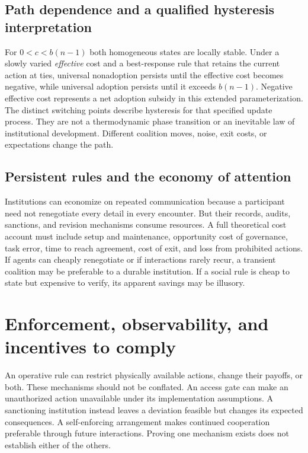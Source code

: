 \subsection{Path dependence and a qualified hysteresis interpretation}
For $0<c<b(n-1)$ both homogeneous states are locally stable. Under a slowly varied \emph{effective} cost and a best-response rule that retains the current action at ties, universal nonadoption persists until the effective cost becomes negative, while universal adoption persists until it exceeds $b(n-1)$. Negative effective cost represents a net adoption subsidy in this extended parameterization. The distinct switching points describe hysteresis for that specified update process. They are not a thermodynamic phase transition or an inevitable law of institutional development. Different coalition moves, noise, exit costs, or expectations change the path.

\subsection{Persistent rules and the economy of attention}

Institutions can economize on repeated communication because a participant need not renegotiate every detail in every encounter. But their records, audits, sanctions, and revision mechanisms consume resources. A full theoretical cost account must include setup and maintenance, opportunity cost of governance, task error, time to reach agreement, cost of exit, and loss from prohibited actions. If agents can cheaply renegotiate or if interactions rarely recur, a transient coalition may be preferable to a durable institution. If a social rule is cheap to state but expensive to verify, its apparent savings may be illusory.


\section{Enforcement, observability, and incentives to comply}\label{MS:sec:enforcement}

An operative rule can restrict physically available actions, change their payoffs, or both. These mechanisms should not be conflated. An access gate can make an unauthorized action unavailable under its implementation assumptions. A sanctioning institution instead leaves a deviation feasible but changes its expected consequences. A self-enforcing arrangement makes continued cooperation preferable through future interactions. Proving one mechanism exists does not establish either of the others.

